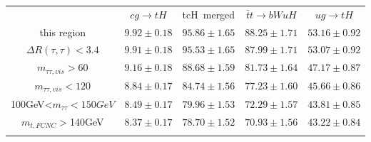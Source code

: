 \begin{tabular}{ccccc} \toprule\toprule
 & $cg\to tH$ & tcH~merged & $\bar{t}t\to bWuH$ & $ug\to tH$\\
this region & $9.92\pm0.18$ & $95.86\pm1.65$ & $88.25\pm1.71$ & $53.16\pm0.92$\\
$\Delta R(\tau,\tau)<3.4$ & $9.91\pm0.18$ & $95.53\pm1.65$ & $87.99\pm1.71$ & $53.07\pm0.92$\\
$m_{\tau\tau,vis}>60$ & $9.16\pm0.18$ & $88.68\pm1.59$ & $81.73\pm1.64$ & $47.17\pm0.87$\\
$m_{\tau\tau,vis}<120$ & $8.84\pm0.17$ & $84.74\pm1.56$ & $77.23\pm1.60$ & $45.66\pm0.86$\\
100GeV<$m_{\tau\tau}<150GeV$ & $8.49\pm0.17$ & $79.96\pm1.53$ & $72.29\pm1.57$ & $43.81\pm0.85$\\
$m_{t,FCNC}>$140GeV & $8.37\pm0.17$ & $78.70\pm1.52$ & $70.93\pm1.56$ & $43.22\pm0.84$\\
\bottomrule\bottomrule\\
\end{tabular}
